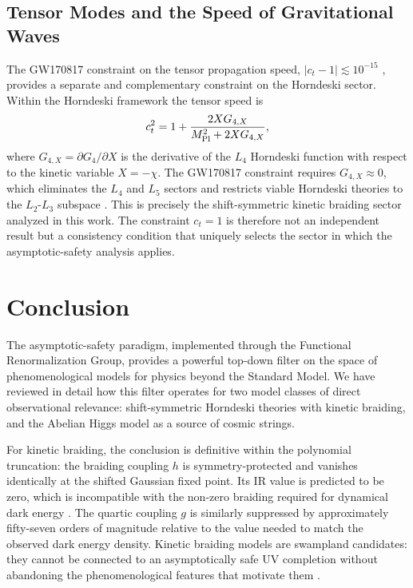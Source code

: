 \documentclass[12pt,a4paper]{article}
\begin{document}
\subsection{Tensor Modes and the Speed of Gravitational Waves}

The GW170817 constraint on the tensor propagation speed, $|c_t - 1| \lesssim
10^{-15}$ \cite{Abbott2016}, provides a separate and complementary constraint
on the Horndeski sector. Within the Horndeski framework the tensor speed is
\cite{Clifton2012,Nicolis2009}
\begin{equation}
c_t^2 = 1 + \frac{2XG_{4,X}}{M_{\rm Pl}^2 + 2XG_{4,X}},
\end{equation}
where $G_{4,X} = \partial G_4/\partial X$ is the derivative of the $L_4$
Horndeski function with respect to the kinetic variable $X = -\chi$.
The GW170817 constraint requires $G_{4,X} \approx 0$, which eliminates the
$L_4$ and $L_5$ sectors and restricts viable Horndeski theories to the
$L_2$-$L_3$ subspace \cite{EichhornLinoWagner2023}. This is precisely the
shift-symmetric kinetic braiding sector analyzed in this work. The
constraint $c_t = 1$ is therefore not an independent result but a
consistency condition that uniquely selects the sector in which the
asymptotic-safety analysis applies.

\section{Conclusion}

The asymptotic-safety paradigm, implemented through the Functional
Renormalization Group, provides a powerful top-down filter on the space of
phenomenological models for physics beyond the Standard Model. We have reviewed
in detail how this filter operates for two model classes of direct observational
relevance: shift-symmetric Horndeski theories with kinetic braiding, and the
Abelian Higgs model as a source of cosmic strings.

For kinetic braiding, the conclusion is definitive within the polynomial
truncation: the braiding coupling $h$ is symmetry-protected and vanishes
identically at the shifted Gaussian fixed point. Its IR value is predicted to
be zero, which is incompatible with the non-zero braiding required for dynamical
dark energy \cite{EichhornLinoWagner2023}. The quartic coupling $g$ is
similarly suppressed by approximately fifty-seven orders of magnitude relative
to the value needed to match the observed dark energy density. Kinetic braiding
models are swampland candidates: they cannot be connected to an asymptotically
safe UV completion without abandoning the phenomenological features that
motivate them \cite{EichhornHebeckerPawlowskiWalcher2024}.
\end{document}
